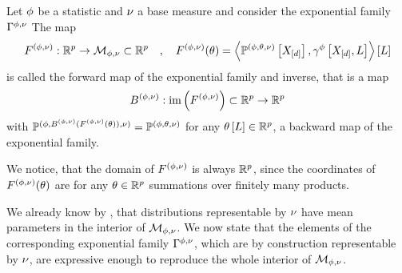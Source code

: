 \begin{definition}
    \label{def:meanForwardBackward}
    Let $\phi$ be a statistic and $\nu$ a base measure and consider the exponential family $\Gamma^{\phi,\nu}$
    The map
    \begin{align*}
        F^{(\phi,\nu)} : \mathbb{R}^{p}\rightarrow\mathcal{M}_{\phi,\nu}\subset\mathbb{R}^{p}
        \quad,\quad F^{(\phi,\nu)}(\theta) = \left\langle \mathbb{P}^{(\phi,\theta,\nu)}\left[X_{[d]}\right],\gamma^{\phi}\left[X_{[d]},L\right]\right\rangle \left[ L \right]
    \end{align*}
    is called the forward map of the exponential family and inverse, that is a map
    \begin{align*}
        B^{(\phi,\nu)} : \mathrm{im}\left(F^{(\phi,\nu)}\right) \subset\mathbb{R}^{p}\rightarrow \mathbb{R}^{p}
    \end{align*}
    with $\mathbb{P}^{(\phi,B^{(\phi,\nu)}(F^{(\phi,\nu)}(\theta)),\nu)} = \mathbb{P}^{(\phi,\theta,\nu)}$ for any $\theta\left[L\right]\in\mathbb{R}^{p}$, a backward map of the exponential family.
\end{definition}

We notice, that the domain of $F^{(\phi,\nu)}$ is always $\mathbb{R}^{p}$, since the coordinates of $F^{(\phi,\nu)}(\theta)$ are for any $\theta\in\mathbb{R}^{p}$ summations over finitely many products.

%
We already know by , that distributions representable by $\nu$ have mean parameters in the interior of $\mathcal{M}_{\phi,\nu}$.
We now state that the elements of the corresponding exponential family $\Gamma^{\phi,\nu}$, which are by construction representable by $\nu$, are expressive enough to reproduce the whole interior of $\mathcal{M}_{\phi,\nu}$.


